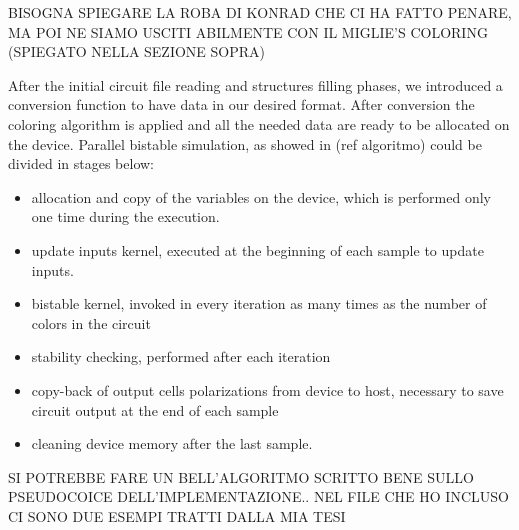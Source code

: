 BISOGNA SPIEGARE LA ROBA DI KONRAD CHE CI HA FATTO PENARE, MA POI NE SIAMO USCITI ABILMENTE CON IL MIGLIE'S COLORING (SPIEGATO NELLA SEZIONE SOPRA)

After the initial circuit file reading and structures filling phases, we introduced a conversion function to have data in our desired format.
After conversion the coloring algorithm is applied and all the needed data are ready to be allocated on the device.\newline
Parallel bistable simulation, as showed in (ref algoritmo) could be divided in stages below:
\begin{itemize}
 \item allocation and copy of the variables on the device, which is performed only one time during the execution.
 \item update inputs kernel, executed at the beginning of each sample to update inputs.
 \item bistable kernel, invoked in every iteration as many times as the number of colors in the circuit
 \item stability checking, performed after each iteration
 \item copy-back of output cells polarizations from device to host, necessary to save circuit output at the end of each sample
 \item cleaning device memory after the last sample.
\end{itemize}


SI POTREBBE FARE UN BELL'ALGORITMO SCRITTO BENE SULLO PSEUDOCOICE DELL'IMPLEMENTAZIONE.. NEL FILE CHE HO INCLUSO CI SONO DUE ESEMPI
TRATTI DALLA MIA TESI





